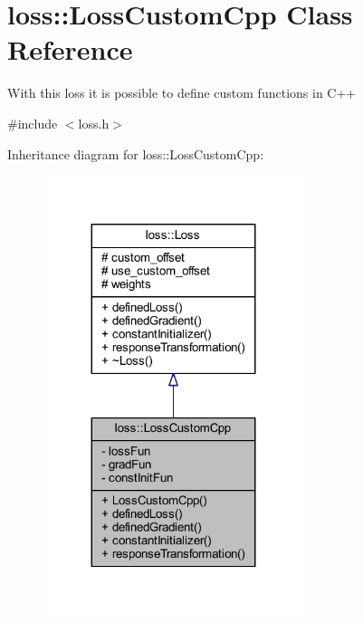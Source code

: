 \hypertarget{classloss_1_1_loss_custom_cpp}{}\section{loss\+:\+:Loss\+Custom\+Cpp Class Reference}
\label{classloss_1_1_loss_custom_cpp}


With this loss it is possible to define custom functions in {\ttfamily C++}  




{\ttfamily \#include $<$loss.\+h$>$}



Inheritance diagram for loss\+:\+:Loss\+Custom\+Cpp\+:
\nopagebreak
\begin{figure}[H]
\begin{center}
\leavevmode
\includegraphics[width=215pt]{classloss_1_1_loss_custom_cpp__inherit__graph}
\end{center}
\end{figure}


